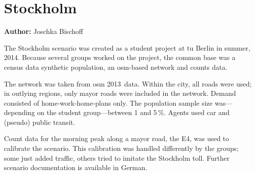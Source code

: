 \chapter{Stockholm}
\label{ch:stockholm}
\hfill \textbf{Author:} Joschka Bischoff


The Stockholm scenario was created as a student project at \gls{tu} Berlin in summer, 2014. 
Because several groups worked on the project, the common base was a census data synthetic population, an \gls{osm}-based network and counts data.

The network was taken from \gls{osm} 2013~data. 
Within the city, all roads were used; in outlying regions, only mayor roads were included in the network. 
Demand consisted of home-work-home-plans only. 
The population sample size was---depending on the student group---between 1 and 5\,\%. Agents used car and (pseudo) public transit.

Count data for the morning peak along a mayor road, the E4, was used to calibrate the scenario. 
This calibration was handled differently by the groups; some just added traffic, others tried to imitate the Stockholm toll. 
Further scenario documentation is available in German. 

